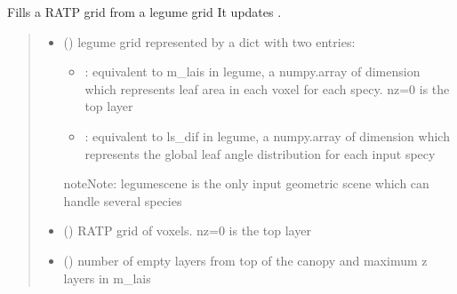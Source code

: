 \documentclass[letterpaper,10pt,english]{sphinxmanual}
\begin{document}
\begin{fulllineitems}
\label{\detokenize{reference:voxelsmesh.fill_ratpgrid_from_legumescene}}
\pysigstartsignatures
{}
\pysigstopsignatures
\sphinxAtStartPar
Fills a RATP grid from a l\sphinxhyphen{}egume grid
It updates .
\begin{quote}\begin{description}
\begin{itemize}
\item {} 
\sphinxAtStartPar
{} () \textendash{} 
\sphinxAtStartPar
l\sphinxhyphen{}egume grid represented by a dict with two entries:
\begin{itemize}
\item {} 
\sphinxAtStartPar
{}: equivalent to m\_lais in l\sphinxhyphen{}egume, a numpy.array of dimension  which represents leaf area in each voxel for each specy. nz=0 is the top layer

\item {} 
\sphinxAtStartPar
{}: equivalent to ls\_dif in l\sphinxhyphen{}egume, a numpy.array of dimension  which represents the global leaf angle distribution for each input specy

\end{itemize}

\begin{sphinxadmonition}{note}{Note:}
\sphinxAtStartPar
legumescene is the only input geometric scene which can handle several species
\end{sphinxadmonition}


\item {} 
\sphinxAtStartPar
{} () \textendash{} RATP grid of voxels. nz=0 is the top layer

\item {} 
\sphinxAtStartPar
{} () \textendash{} number of empty layers from top of the canopy and maximum z layers in m\_lais

\end{itemize}

\end{description}\end{quote}

\end{fulllineitems}
\end{document}
